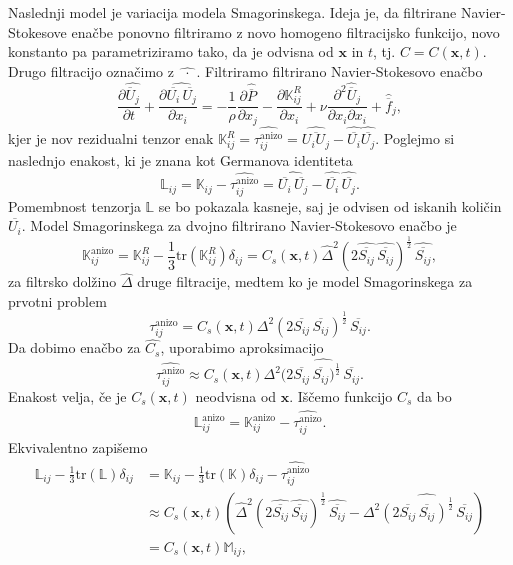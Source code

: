 \documentclass[mat2, tisk]{fmfdelo}
\newcommand{\bd}{\textbf}
\begin{document}
Naslednji model je variacija modela Smagorinskega. Ideja je, da
filtrirane Navier-Stokesove enačbe ponovno filtriramo z novo homogeno
filtracijsko funkcijo, novo konstanto pa parametriziramo tako, da je odvisna od $\bd{x}$ in $t$,
tj. $C = C(\bd{x}, t)$. Drugo filtracijo označimo z $\widehat{\,\,\cdot\,\,}$.
Filtriramo filtrirano Navier-Stokesovo enačbo 
$$
\frac{\partial \widehat{\overline{U}_j}}{\partial t} + \frac{\partial \widehat{\overline{U_i}\, \overline{U_j}}}{\partial x_i} = -\frac{1}{\rho} \frac{\partial \widehat{\overline{P}}}{\partial x_j} 
- \frac{\partial \mathbb{K}_{ij}^R}{\partial x_i}+ \nu \frac{\partial^2 \widehat{\overline{U}}_j}{\partial x_i \partial x_i} + \widehat{\overline{f}}_j,
$$
kjer je nov rezidualni tenzor enak $\mathbb{K}_{ij}^R = \widehat{\tau_{ij}^\text{anizo}} = \widehat{\overline{U_i U_j}} - \widehat{\overline{U_i}} \widehat{\overline{U_j}}$.
Poglejmo si naslednjo enakost, ki je znana kot Germanova identiteta
$$
\mathbb{L}_{ij} = \mathbb{K}_{ij} - \widehat{\tau_{ij}^\text{anizo}} = \widehat{\overline{U_i} \,\overline{U_j}} - \widehat{\overline{U_i}}\, \widehat{\overline{U_j}}.
$$
Pomembnost tenzorja $\mathbb{L}$ se bo pokazala kasneje, saj je 
odvisen od iskanih količin $\overline{U_i}$. 
Model Smagorinskega za dvojno filtrirano Navier-Stokesovo enačbo je
$$
\mathbb{K}_{ij}^\text{anizo} = \mathbb{K}_{ij}^R - \frac{1}{3} \text{tr}(\mathbb{K}_{ij}^R) \delta_{ij} = C_s(\bd{x}, t) \widehat{\Delta}^2 (2 \widehat{\overline{S_{ij}}} \,\widehat{\overline{S_{ij}}})^\frac{1}{2} \,\widehat{\overline{S_{ij}}},
$$
za filtrsko dolžino $\widehat{\Delta}$ druge filtracije, 
medtem ko je model Smagorinskega za prvotni problem
$$
\tau_{ij}^\text{anizo} = C_s(\bd{x}, t) \Delta^2 (2 \overline{S_{ij}} \,\overline{S_{ij}})^\frac{1}{2} \,\overline{S_{ij}}.
$$
Da dobimo enačbo za $\widehat{C_s}$, uporabimo aproksimacijo 
$$
\widehat{\tau_{ij}^\text{anizo}} \approx C_s(\bd{x}, t) \Delta^2 (\widehat{2 \overline{S_{ij}} \,\overline{S_{ij}})^\frac{1}{2} \,\overline{S_{ij}}}.
$$
Enakost velja, če je $C_s(\bd{x}, t)$ neodvisna od $\bd{x}$. 
Iščemo funkcijo $C_s$ da bo 
\begin{align*}
\mathbb{L}_{ij}^\text{anizo} = \mathbb{K}_{ij}^\text{anizo} - \widehat{\tau_{ij}^\text{anizo}}.
\end{align*}
Ekvivalentno zapišemo 
\begin{align*}
\mathbb{L}_{ij} - \frac{1}{3}\text{tr}(\mathbb{L}) \delta_{ij} &= \mathbb{K}_{ij} - \frac{1}{3}\text{tr}(\mathbb{K}) \delta_{ij} - \widehat{\tau_{ij}^\text{anizo}} \\
&\approx C_s(\bd{x}, t)(\widehat{\Delta}^2 (2 \widehat{\overline{S_{ij}}} \,\widehat{\overline{S_{ij}}})^\frac{1}{2} \,\widehat{\overline{S_{ij}}} - \Delta^2 \widehat{(2 \overline{S_{ij}} \,\overline{S_{ij}})^\frac{1}{2} \,\overline{S_{ij}}}) \\
&= C_s(\bd{x}, t)\mathbb{M}_{ij},
\end{align*}
\end{document}
